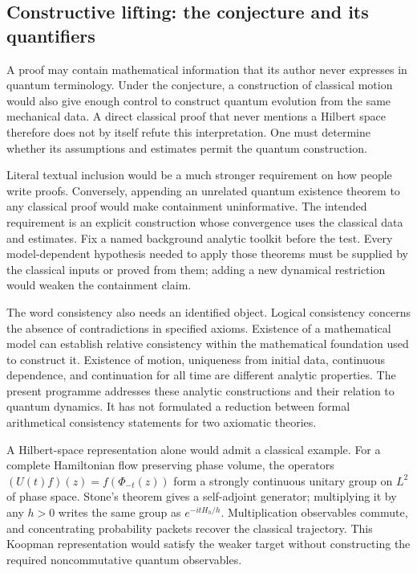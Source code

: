 \documentclass[11pt,a4paper]{article}
\begin{document}
\subsection{Constructive lifting: the conjecture and its
quantifiers}\label{constructive-lifting-the-conjecture-and-its-quantifiers}

A proof may contain mathematical information that its author never
expresses in quantum terminology. Under the conjecture, a construction
of classical motion would also give enough control to construct quantum
evolution from the same mechanical data. A direct classical proof that
never mentions a Hilbert space therefore does not by itself refute this
interpretation. One must determine whether its assumptions and estimates
permit the quantum construction.

Literal textual inclusion would be a much stronger requirement on how
people write proofs. Conversely, appending an unrelated quantum
existence theorem to any classical proof would make containment
uninformative. The intended requirement is an explicit construction
whose convergence uses the classical data and estimates. Fix a named
background analytic toolkit before the test. Every model-dependent
hypothesis needed to apply those theorems must be supplied by the
classical inputs or proved from them; adding a new dynamical restriction
would weaken the containment claim.

The word consistency also needs an identified object. Logical
consistency concerns the absence of contradictions in specified axioms.
Existence of a mathematical model can establish relative consistency
within the mathematical foundation used to construct it. Existence of
motion, uniqueness from initial data, continuous dependence, and
continuation for all time are different analytic properties. The present
programme addresses these analytic constructions and their relation to
quantum dynamics. It has not formulated a reduction between formal
arithmetical consistency statements for two axiomatic theories.

A Hilbert-space representation alone would admit a classical example.
For a complete Hamiltonian flow preserving phase volume, the operators
\((U(t)f)(z)=f(\Phi_{-t}(z))\) form a strongly continuous unitary group
on \(L^2\) of phase space. Stone's theorem gives a self-adjoint
generator; multiplying it by any \(h>0\) writes the same group as
\(e^{-itH_h/h}\). Multiplication observables commute, and concentrating
probability packets recover the classical trajectory. This Koopman
representation would satisfy the weaker target without constructing the
required noncommutative quantum observables.
\end{document}
